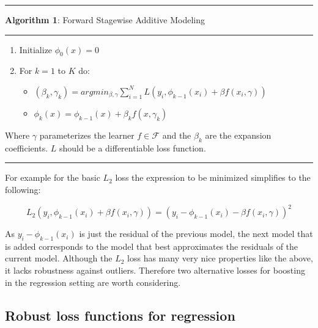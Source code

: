 \documentclass[
]{book}
\providecommand{\tightlist}{%
  \setlength{\itemsep}{0pt}\setlength{\parskip}{0pt}}
\begin{document}
\begin{center}\rule{0.5\linewidth}{0.5pt}\end{center}

\textbf{Algorithm 1}: Forward Stagewise Additive Modeling \citep{elements}

\begin{center}\rule{0.5\linewidth}{0.5pt}\end{center}

\begin{enumerate}
\def\labelenumi{\arabic{enumi}.}
\item
  Initialize \(\phi_0(x) = 0\)
\item
  For \(k = 1\) to \(K\) do:

  \begin{itemize}
  \tightlist
  \item
    \((\beta_k,\gamma_k) = argmin_{\beta,\gamma}\sum_{i=1}^N L(y_i,\phi_{k-1}(x_i) + \beta f(x_i,\gamma))\)
  \item
    \(\phi_k(x) = \phi_{k-1}(x) + \beta_k f(x, \gamma_k)\)
  \end{itemize}
\end{enumerate}

Where \(\gamma\) parameterizes the learner \(f \in \mathcal{F}\) and the \(\beta_k\) are the expansion coefficients. \(L\) should be a differentiable loss function.

\begin{center}\rule{0.5\linewidth}{0.5pt}\end{center}

For example for the basic \(L_2\) loss the expression to be minimized simplifies to the following:

\[
L_2(y_i,\phi_{k-1}(x_i) + \beta f(x_i,\gamma)) = (y_i - \phi_{k-1}(x_i) - \beta f(x_i,\gamma))^2
\]

As \(y_i - \phi_{k-1}(x_i)\) is just the residual of the previous model, the next model that is added corresponds to the model that best approximates the residuals of the current model. Although the \(L_2\) loss has many very nice properties like the above, it lacks robustness against outliers. Therefore two alternative losses for boosting in the regression setting are worth considering.

\hypertarget{robust-loss-functions-for-regression}{%
\subsection{Robust loss functions for regression}\label{robust-loss-functions-for-regression}}
\end{document}
